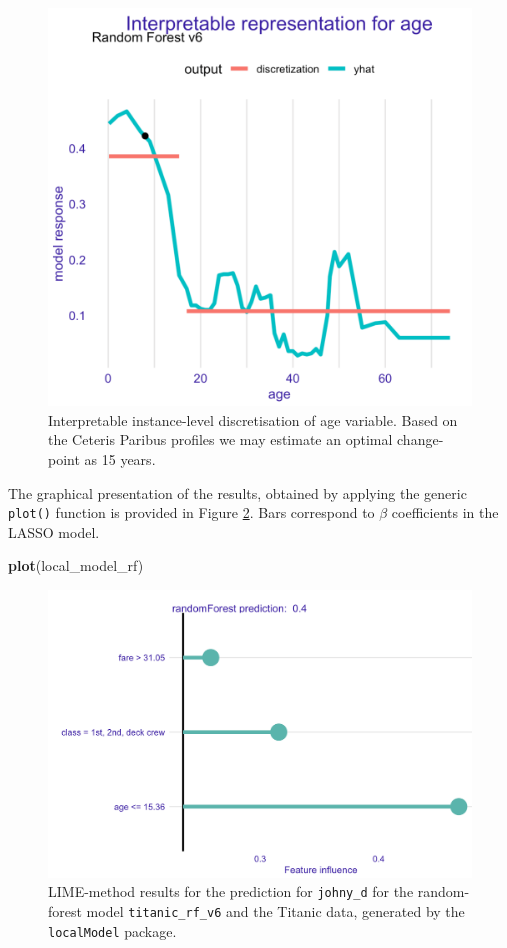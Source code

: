 \documentclass[]{krantz}
\newenvironment{Shaded}{\begin{snugshade}}{\end{snugshade}}
\newcommand{\KeywordTok}[1]{\textcolor[rgb]{0.13,0.29,0.53}{\textbf{#1}}}
\newcommand{\NormalTok}[1]{#1}
\begin{document}
\begin{figure}

{\centering \includegraphics[width=0.6\linewidth]{figure/LIMEexample02} 

}

\caption{Interpretable instance-level discretisation of age variable. Based on the Ceteris Paribus profiles we may estimate an optimal change-point as 15 years.}\label{fig:LIMEexample02}
\end{figure}

The graphical presentation of the results, obtained by applying the generic \texttt{plot()} function is provided in Figure \ref{fig:limeExplLocalModelTitanic}.
Bars correspond to \(\beta\) coefficients in the LASSO model.

\begin{Shaded}
\begin{Highlighting}[]
\KeywordTok{plot}\NormalTok{(local_model_rf)}
\end{Highlighting}
\end{Shaded}



\begin{figure}

{\centering \includegraphics[width=0.6\linewidth]{figure/lime_expl_localModel_titanic} 

}

\caption{LIME-method results for the prediction for \texttt{johny\_d} for the random-forest model \texttt{titanic\_rf\_v6} and the Titanic data, generated by the \texttt{localModel} package.}\label{fig:limeExplLocalModelTitanic}
\end{figure}
\end{document}

